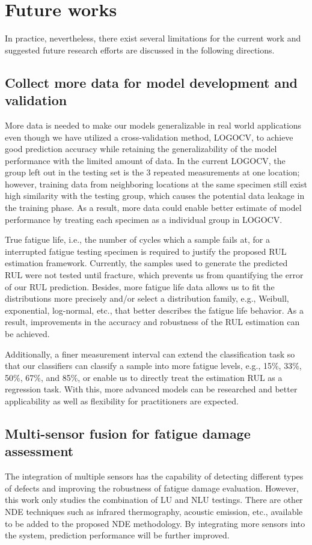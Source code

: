 \section{Future works}
In practice, nevertheless, there exist several limitations for the current work and suggested future research efforts are discussed in the following directions.

\subsection{Collect more data for model development and validation}
More data is needed to make our models generalizable in real world applications even though we have utilized a cross-validation method, LOGOCV, to achieve good prediction accuracy while retaining the generalizability of the model performance with the limited amount of data. In the current LOGOCV, the group left out in the testing set is the 3 repeated measurements at one location; however, training data from neighboring locations at the same specimen still exist high similarity with the testing group, which causes the potential data leakage in the training phase. As a result, more data could enable better estimate of model performance by treating each specimen as a individual group in LOGOCV.

True fatigue life, i.e., the number of cycles which a sample fails at, for a interrupted fatigue testing specimen is required to justify the proposed RUL estimation framework. Currently, the samples used to generate the predicted RUL were not tested until fracture, which prevents us from quantifying the error of our RUL prediction. Besides, more fatigue life data allows us to fit the distributions more precisely and/or select a distribution family, e.g., Weibull, exponential, log-normal, etc., that better describes the fatigue life behavior. As a result, improvements in the accuracy and robustness of the RUL estimation can be achieved.

Additionally, a finer measurement interval can extend the classification task so that our classifiers can classify a sample into more fatigue levels, e.g., 15\%, 33\%, 50\%, 67\%, and 85\%, or enable us to directly treat the estimation RUL as a regression task. With this, more advanced models can be researched and better applicability as well as flexibility for practitioners are expected.

\subsection{Multi-sensor fusion for fatigue damage assessment}
The integration of multiple sensors has the capability of detecting different types of defects and improving the robustness of fatigue damage evaluation. However, this work only studies the combination of LU and NLU testings. There are other NDE techniques such as infrared thermography, acoustic emission, etc., available to be added to the proposed NDE methodology. By integrating more sensors into the system, prediction performance will be further improved.

